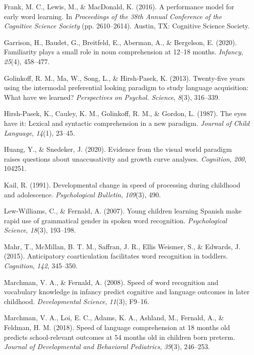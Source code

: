 \documentclass[10pt, letterpaper]{article}
\begin{document}
\leavevmode\hypertarget{ref-frank2016b}{}%
Frank, M. C., Lewis, M., \& MacDonald, K. (2016). A performance model
for early word learning. In \emph{Proceedings of the 38th Annual
Conference of the Cognitive Science Society} (pp. 2610--2614). Austin,
TX: Cognitive Science Society.

\leavevmode\hypertarget{ref-Garrison2020}{}%
Garrison, H., Baudet, G., Breitfeld, E., Aberman, A., \& Bergelson, E.
(2020). Familiarity plays a small role in noun comprehension at 12--18
months. \emph{Infancy}, \emph{25}(4), 458--477.

\leavevmode\hypertarget{ref-Golinkoff2013}{}%
Golinkoff, R. M., Ma, W., Song, L., \& Hirsh-Pasek, K. (2013).
Twenty-five years using the intermodal preferential looking paradigm to
study language acquisition: What have we learned? \emph{Perspectives on
Psychol. Science}, \emph{8}(3), 316--339.

\leavevmode\hypertarget{ref-Hirsh-Pasek1987}{}%
Hirsh-Pasek, K., Cauley, K. M., Golinkoff, R. M., \& Gordon, L. (1987).
The eyes have it: Lexical and syntactic comprehension in a new paradigm.
\emph{Journal of Child Language}, \emph{14}(1), 23--45.

\leavevmode\hypertarget{ref-Huang2020}{}%
Huang, Y., \& Snedeker, J. (2020). Evidence from the visual world
paradigm raises questions about unaccusativity and growth curve
analyses. \emph{Cognition}, \emph{200}, 104251.

\leavevmode\hypertarget{ref-kail1991}{}%
Kail, R. (1991). Developmental change in speed of processing during
childhood and adolescence. \emph{Psychological Bulletin}, \emph{109}(3),
490.

\leavevmode\hypertarget{ref-Lew-Williams2007}{}%
Lew-Williams, C., \& Fernald, A. (2007). Young children learning Spanish
make rapid use of grammatical gender in spoken word recognition.
\emph{Psychological Science}, \emph{18}(3), 193--198.

\leavevmode\hypertarget{ref-Mahr2015}{}%
Mahr, T., McMillan, B. T. M., Saffran, J. R., Ellis Weismer, S., \&
Edwards, J. (2015). Anticipatory coarticulation facilitates word
recognition in toddlers. \emph{Cognition}, \emph{142}, 345--350.

\leavevmode\hypertarget{ref-Marchman2008}{}%
Marchman, V. A., \& Fernald, A. (2008). Speed of word recognition and
vocabulary knowledge in infancy predict cognitive and language outcomes
in later childhood. \emph{Developmental Science}, \emph{11}(3), F9--16.

\leavevmode\hypertarget{ref-Marchman2018}{}%
Marchman, V. A., Loi, E. C., Adams, K. A., Ashland, M., Fernald, A., \&
Feldman, H. M. (2018). Speed of language comprehension at 18 months old
predicts school-relevant outcomes at 54 months old in children born
preterm. \emph{Journal of Developmental and Behavioral Pediatrics},
\emph{39}(3), 246--253.
\end{document}

